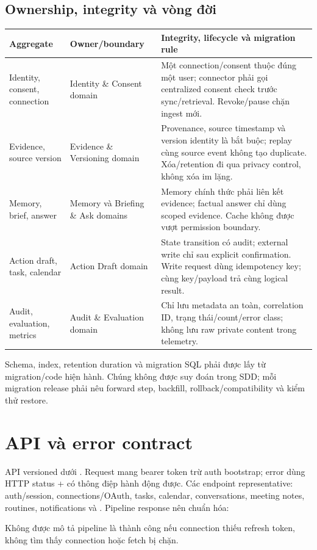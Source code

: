 \documentclass[11pt,a4paper]{article}
\begin{document}
\subsection{Ownership, integrity và vòng đời}
\begin{longtable}{p{3.1cm}p{3.4cm}p{6.8cm}}
\toprule Aggregate & Owner/boundary & Integrity, lifecycle và migration rule \\ \midrule\endhead
Identity, consent, connection & Identity \& Consent domain & Một connection/consent thuộc đúng một user; connector phải gọi centralized consent check trước sync/retrieval. Revoke/pause chặn ingest mới. \\
Evidence, source version & Evidence \& Versioning domain & Provenance, source timestamp và version identity là bắt buộc; replay cùng source event không tạo duplicate. Xóa/retention đi qua privacy control, không xóa im lặng. \\
Memory, brief, answer & Memory và Briefing \& Ask domains & Memory chính thức phải liên kết evidence; factual answer chỉ dùng scoped evidence. Cache không được vượt permission boundary. \\
Action draft, task, calendar & Action Draft domain & State transition có audit; external write chỉ sau explicit confirmation. Write request dùng idempotency key; cùng key/payload trả cùng logical result. \\
Audit, evaluation, metrics & Audit \& Evaluation domain & Chỉ lưu metadata an toàn, correlation ID, trạng thái/count/error class; không lưu raw private content trong telemetry. \\
\bottomrule
\end{longtable}

Schema, index, retention duration và migration SQL phải được lấy từ migration/code hiện hành. Chúng không được suy đoán trong SDD; mỗi migration release phải nêu forward step, backfill, rollback/compatibility và kiểm thử restore.

\section{API và error contract}
API versioned dưới . Request mang bearer token trừ auth bootstrap; error dùng HTTP status +  có thông điệp hành động được. Các endpoint representative: auth/session, connections/OAuth, tasks, calendar, conversations, meeting notes, routines, notifications và . Pipeline response nên chuẩn hóa:\\
\begin{center}\end{center}
Không được mô tả pipeline là thành công nếu connection thiếu refresh token, không tìm thấy connection hoặc fetch bị chặn.
\end{document}
